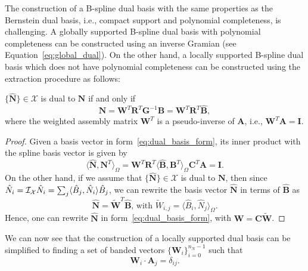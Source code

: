 The construction of a B-spline dual basis with the same properties as the Bernstein dual basis, i.e., compact support and polynomial completeness, is challenging. A globally supported B-spline dual basis with polynomial completeness can be constructed using an inverse Gramian (see Equation~\eqref{eq:global_dual}). On the other hand, a locally supported B-spline dual basis which does not have polynomial completeness can be constructed using the \Bezier extraction procedure as follows:
\begin{lemma}
	$\{\hat{\mathbf{N}}\}\in\mathcal{X}$ is dual to ${\mathbf{N}}$ if and only if
	\begin{equation}
		\hat{\mathbf{N}} = \mathbf{W}^T\mathbf{R}^T\mathbf{G}^{-1}\mathbf{B}=\mathbf{W}^T\mathbf{R}^T\hat{\mathbf{B}},\label{eq:dual_basis_form}
	\end{equation}
	where the weighted assembly matrix $\mathbf{W}^T$ is a pseudo-inverse of $\mathbf{A}$, i.e., $\mathbf{W}^T\mathbf{A} = \mathbf{I}$.
\end{lemma}
\begin{proof}
	Given a basis vector in form~\eqref{eq:dual_basis_form}, its inner product with the spline basis vector is given by
	\begin{equation}
		\langle\hat{\mathbf{N}},\mathbf{N}^T\rangle_\Omega = \mathbf{W}^T\mathbf{R}^T\langle\hat{\mathbf{B}},\mathbf{B}^T\rangle_\Omega\mathbf{C}^T\mathbf{A}=\mathbf{I}.
	\end{equation}
	On the other hand, if we assume that $\{\hat{\mathbf{N}}\}\in\mathcal{X}$ is dual to ${\mathbf{N}}$, then since $\hat{N}_i=\mathcal{I}_\mathcal{X}\hat{N}_i=\sum_j\langle \hat{B}_j, \hat{N}_i\rangle \hat{B}_j$, we can rewrite the basis vector $\hat{\mathbf{N}}$ in terms of $\hat{\mathbf{B}}$ as
	\begin{equation}
		\hat{\mathbf{N}} = \tilde{\mathbf{W}}^T\hat{\mathbf{B}}\text{, with } \tilde{W}_{i,j} = \langle{\hat{B}_i,\hat{N}_j}\rangle_\Omega.
	\end{equation}
	Hence, one can rewrite $\hat{\mathbf{N}}$ in form~\eqref{eq:dual_basis_form}, with $\mathbf{W}=\mathbf{C}\tilde{\mathbf{W}}$.
\end{proof}
We can now see that the construction of a locally supported dual basis can be simplified to finding a set of banded vectors $\{\mathbf{W}_i\}_{i=0}^{n_N-1}$ such that
\begin{equation}
	\mathbf{W}_i\cdot\mathbf{A}_j=\delta_{ij}.\label{eq:biorthonormal}
\end{equation}


